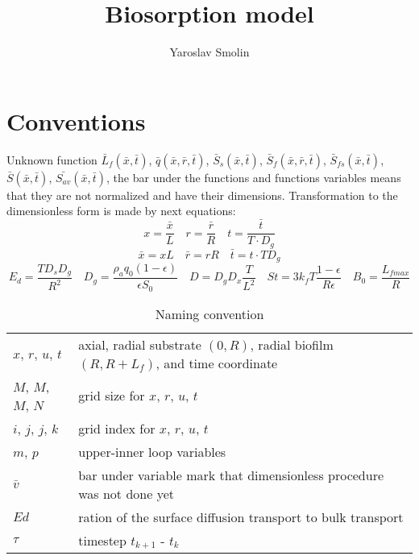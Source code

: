 \documentclass[12pt]{article}
\title{Biosorption model}
\author{Yaroslav Smolin}
\begin{document}
\maketitle	

\section{Conventions}
Unknown function $\bar{L}_f(\bar{x}, \bar{t})$, $\bar{q}(\bar{x}, \bar{r}, \bar{t})$, $\bar{S}_s(\bar{x},\bar{t})$, $\bar{S}_f(\bar{x}, \bar{r}, \bar{t})$, $\bar{S}_{fs}(\bar{x},  \bar{t})$, $\bar{S}(\bar{x}, \bar{t})$, $\bar{S_{av}}(\bar{x}, \bar{t})$, the bar under the functions and functions variables means that they are not normalized and have their dimensions. Transformation to the dimensionless form is made by next equations:\\

\begin{equation}
x=\frac{\bar{x}}{L} \quad r=\frac{\bar{r}}{R}  \quad t=\frac{\bar{t}}{T\cdot D_g}
\end{equation}
\begin{equation}\label{eq:nondimArgs}
\bar{x}=xL \quad \bar{r}=rR  \quad \bar{t}=t\cdot T D_g
\end{equation}
\begin{equation}\label{eq:nondimSubs}
E_d=\frac{TD_sD_g}{R^2} \quad D_g=\frac{\rho_aq_0(1-\epsilon)}{\epsilon S_0}
\quad D=D_gD_x\frac{T}{L^2}
\quad St=3k_fT\frac{1-\epsilon}{R\epsilon}
\quad B_0=\frac{L_{fmax}}{R}
\end{equation}

\setlength{\abovetopsep}{4pt}
\begin{table}[!htbp]
	\caption{Naming convention}
	\begin{tabular}{l l}
		\toprule
		
		\midrule
		$x$, $r$, $u$, $t$ & axial, radial substrate $(0, R)$, radial biofilm $(R, R+L_f)$, and time coordinate\\
		$M$, $M$, $M$, $N$  & grid size for $x$, $r$, $u$, $t$\\
		$i$, $j$, $j$, $k$ &  grid index for $x$, $r$, $u$, $t$\\
		$m$, $p$ & upper-inner loop variables\\
		$\bar{v}$ & bar under variable mark that dimensionless procedure was not done yet\\
		 $Ed$ & ration of the surface diffusion transport to bulk transport\\
		$\tau$ & timestep $t_{k+1}$ - $t_k$\\
		\bottomrule
	\end{tabular}
\end{table}
\end{document}
